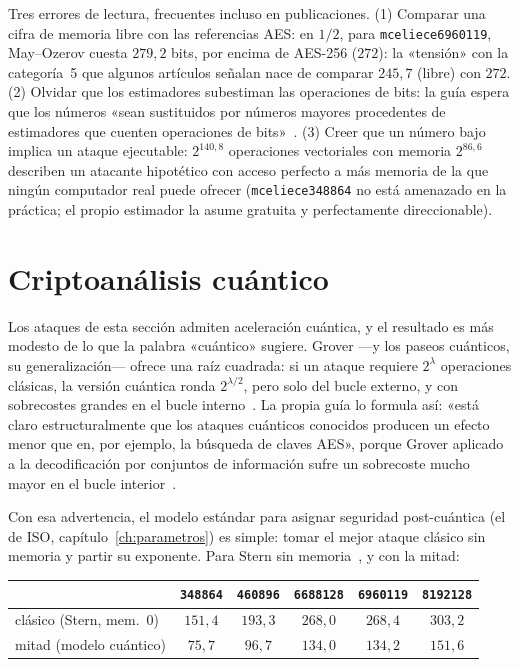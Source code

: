 \documentclass[11pt,a4paper,oneside]{report}
\begin{document}
\begin{trampa}
Tres errores de lectura, frecuentes incluso en publicaciones. (1)
Comparar una cifra de memoria libre con las referencias AES: en
$1/2$, para \texttt{mceliece6960119}, May--Ozerov cuesta $279{,}2$
bits, por encima de AES-256 ($272$): la «tensión» con la categoría~5
que algunos artículos señalan nace de comparar $245{,}7$ (libre) con
$272$. (2) Olvidar que los estimadores subestiman las operaciones de
bits: la guía espera que los números «sean sustituidos por números
mayores procedentes de estimadores que cuenten operaciones de
bits»~\cite{cmsecurity}. (3) Creer que un número bajo implica un
ataque ejecutable: $2^{140{,}8}$ operaciones vectoriales con memoria
$2^{86{,}6}$ describen un atacante hipotético con acceso perfecto a
más memoria de la que ningún computador real puede ofrecer
(\texttt{mceliece348864} no está amenazado en la práctica; el propio
estimador la asume gratuita y perfectamente direccionable).
\end{trampa}

\section{Criptoanálisis cuántico}\label{sec:isd-cuantico}

Los ataques de esta sección admiten aceleración cuántica, y el
resultado es más modesto de lo que la palabra «cuántico» sugiere.
Grover ---y los paseos cuánticos, su generalización--- ofrece una
raíz cuadrada: si un ataque requiere $2^{\lambda}$ operaciones
clásicas, la versión cuántica ronda $2^{\lambda/2}$, pero solo del
bucle externo, y con sobrecostes grandes en el bucle
interno~\cite{grover1996,bernstein2010,kachigar2017,kirshanova2018}.
La propia guía lo formula así: «está claro estructuralmente que los
ataques cuánticos conocidos producen un efecto menor que en, por
ejemplo, la búsqueda de claves AES», porque Grover aplicado a la
decodificación por conjuntos de información sufre un sobrecoste
mucho mayor en el bucle interior~\cite{cmsecurity}.

Con esa advertencia, el modelo estándar para asignar seguridad
post-cuántica (el de ISO, capítulo~\ref{ch:parametros}) es simple:
tomar el mejor ataque clásico sin memoria y partir su exponente.
Para Stern sin memoria~\cite{cmsecurity}, y con la mitad:

\begin{center}
\small
\begin{tabular}{lccccc}
\toprule
& \texttt{348864} & \texttt{460896} & \texttt{6688128} & \texttt{6960119} & \texttt{8192128}\\
\midrule
clásico (Stern, mem.\ $0$) & $151{,}4$ & $193{,}3$ & $268{,}0$ & $268{,}4$ & $303{,}2$\\
mitad (modelo cuántico) & $75{,}7$ & $96{,}7$ & $134{,}0$ & $134{,}2$ & $151{,}6$\\
\bottomrule
\end{tabular}
\end{center}
\end{document}
